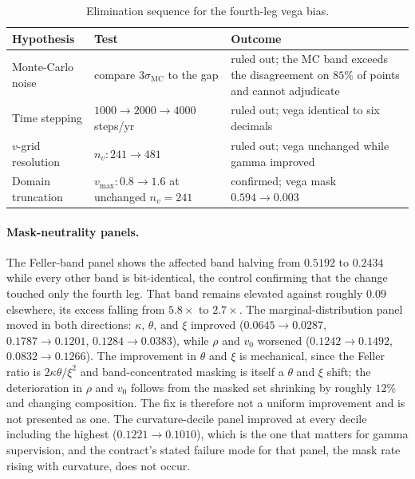 \documentclass[10pt]{article}
\begin{document}
\begin{table}[h]
\centering\footnotesize
\begin{tabular}{@{}lll@{}}
\toprule
Hypothesis & Test & Outcome \\
\midrule
Monte-Carlo noise & compare $3\sigma_{\mathrm{MC}}$ to the gap & ruled out; the MC band exceeds the disagreement on $85\%$ of points and cannot adjudicate \\
Time stepping & $1000 \to 2000 \to 4000$ steps/yr & ruled out; vega identical to six decimals \\
$v$-grid resolution & $n_v: 241 \to 481$ & ruled out; vega unchanged while gamma improved \\
Domain truncation & $v_{\max}: 0.8 \to 1.6$ at unchanged $n_v = 241$ & confirmed; vega mask $0.594 \to 0.003$ \\
\bottomrule
\end{tabular}
\caption{Elimination sequence for the fourth-leg vega bias.}
\label{tab:adi}
\end{table}

\paragraph{Mask-neutrality panels.} The Feller-band panel shows the affected band
halving from $0.5192$ to $0.2434$ while every other band is bit-identical, the
control confirming that the change touched only the fourth leg. That band remains
elevated against roughly $0.09$ elsewhere, its excess falling from $5.8\times$ to
$2.7\times$. The marginal-distribution panel moved in both directions: $\kappa$,
$\theta$, and $\xi$ improved ($0.0645 \to 0.0287$, $0.1787 \to 0.1201$,
$0.1284 \to 0.0383$), while $\rho$ and $v_0$ worsened ($0.1242 \to 0.1492$,
$0.0832 \to 0.1266$). The improvement in $\theta$ and $\xi$ is mechanical, since the
Feller ratio is $2\kappa\theta/\xi^{2}$ and band-concentrated masking is itself a
$\theta$ and $\xi$ shift; the deterioration in $\rho$ and $v_0$ follows from the
masked set shrinking by roughly $12\%$ and changing composition. The fix is
therefore not a uniform improvement and is not presented as one. The
curvature-decile panel improved at every decile including the highest
($0.1221 \to 0.1010$), which is the one that matters for gamma supervision, and the
contract's stated failure mode for that panel, the mask rate rising with curvature,
does not occur.
\end{document}
